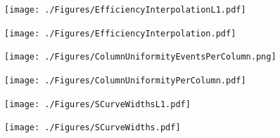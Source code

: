 \documentclass[a4paper,12pt,twoside]{article}
\begin{document}
\begin{appendices}
\begin{figure} [h!]
\centering
\begin{minipage}{.48\textwidth}
  \centering
  \texttt{[image: ./Figures/EfficiencyInterpolationL1.pdf]}
  \label{EfficiencyInterpolationL1}
\end{minipage}%
\hspace{2mm}
\begin{minipage}{.48\textwidth}
  \centering
  \texttt{[image: ./Figures/EfficiencyInterpolation.pdf]}
  \label{EfficiencyInterpolation}
\end{minipage}
\end{figure}

\begin{figure} [h!]
\centering
\begin{minipage}{.48\textwidth}
  \centering
  \texttt{[image: ./Figures/ColumnUniformityEventsPerColumn.png]}
  \label{UniformityEvent}
\end{minipage}%
\hspace{2mm}
\begin{minipage}{.48\textwidth}
  \centering
  \texttt{[image: ./Figures/ColumnUniformityPerColumn.pdf]}
  \label{Uniformity}
\end{minipage}
\end{figure}


\begin{figure} [h!]
\centering
\begin{minipage}{.48\textwidth}
  \centering
  \texttt{[image: ./Figures/SCurveWidthsL1.pdf]}
  \label{SCurveL1}
\end{minipage}%
\hspace{2mm}
\begin{minipage}{.48\textwidth}
  \centering
  \texttt{[image: ./Figures/SCurveWidths.pdf]}
  \label{SCurveL2}
\end{minipage}
\end{figure}


\end{appendices}
\end{document}
